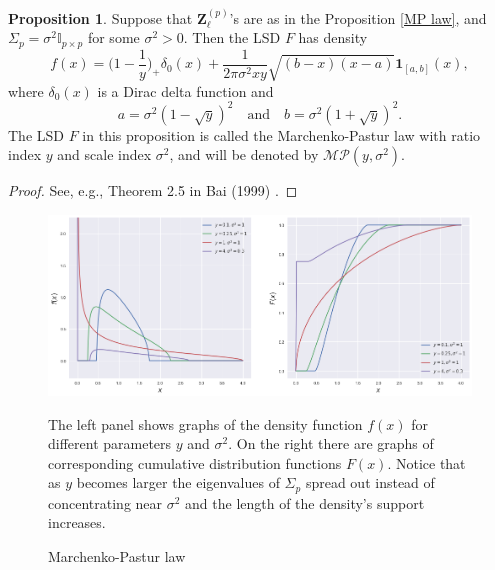 \documentclass[a4paper,11pt]{book}
\theoremstyle{plain}
\theoremstyle{definition}
\newtheorem{prps}[thm]{Proposition}
\begin{document}
	\begin{prps} \label{one-dim MP}
		Suppose that $\mathbf{Z}_\ell^{(p)}$'s are as in the Proposition \ref{MP law}, and $\Sigma_p = \sigma^2 \mathbb{I}_{p \times p}$ for some $\sigma^2>0$. Then the LSD $F$ has density
		\[ f(x) = \Big(1-\frac{1}{y}\Big)_+\delta_0(x) + \frac{1}{2 \pi \sigma^2 xy} \sqrt{(b-x)(x-a)} \mathbf{1}_{[a,b]}(x), \]
		where $\delta_0(x)$ is a Dirac delta function and
		\[ a = \sigma^2(1-\sqrt{y})^2 \quad \text{and} \quad b = \sigma^2(1+\sqrt{y})^2. \]
		The LSD $F$ in this proposition is called the Marchenko-Pastur law with ratio index $y$ and scale index $\sigma^2$, and will be denoted by $\mathcal{MP}(y, \sigma^2)$.
	\end{prps}
	\begin{proof}
		See, e.g., Theorem 2.5 in Bai (1999) \cite{Bai}.
	\end{proof}
	\begin{figure}
		\begin{center} \centering
			\includegraphics[scale=0.4]{MP}
			\caption{Marchenko-Pastur law}
			\smallskip
			\small
			The left panel shows graphs of the density function $f(x)$ for different parameters $y$ and $\sigma^2$. On the right there are graphs of corresponding cumulative distribution functions $F(x)$. Notice that as $y$ becomes larger the eigenvalues of $\Sigma_p$ spread out instead of concentrating near $\sigma^2$ and the length of the density's support increases.
		\end{center}
	\end{figure}
	
\end{document}
